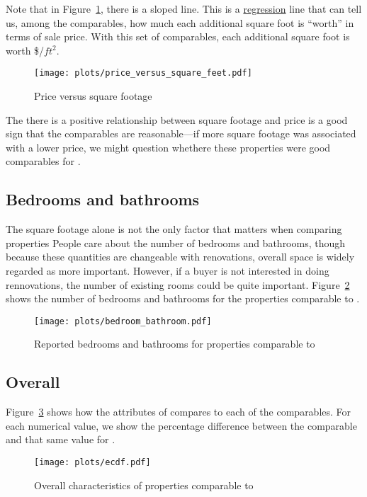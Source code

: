 \documentclass[
12pt, %
letterpaper, %
oneside, %
headinclude,footinclude, %
BCOR5mm, %
]{scrartcl}
\begin{document}
Note that in Figure~\ref{fig:price_versus_square_feet}, there is a sloped line.
This is a \href{https://en.wikipedia.org/wiki/Linear_regression}{regression} line that can tell us, among the comparables, how much each additional square foot is ``worth'' in terms of sale price.
With this set of comparables, each additional square foot is worth \$\MarginalPricePerFoot{}/$ft^2$. 

\begin{figure}
\centering
\caption{Price versus square footage} \label{fig:price_versus_square_feet}  
\texttt{[image: plots/price\_versus\_square\_feet.pdf]} 
\end{figure}

The there is a positive relationship between square footage and price is a good sign that the comparables are reasonable---if more square footage was associated with a lower price, we might question whethere these properties were good comparables for \PropertyName{}. 

\subsection{Bedrooms and bathrooms}
The square footage alone is not the only factor that matters when comparing properties
People care about the number of bedrooms and bathrooms, though because these quantities are changeable with renovations, overall space is widely regarded as more important.
However, if a buyer is not interested in doing rennovations, the number of existing rooms could be quite important.
Figure~\ref{fig:bedroom_bathroom} shows the number of bedrooms and bathrooms for the properties comparable to \PropertyName{}. 

\begin{figure}
\centering
\caption{Reported bedrooms and bathrooms for properties comparable to \PropertyName{}} \label{fig:bedroom_bathroom}  
\texttt{[image: plots/bedroom\_bathroom.pdf]} 
\end{figure}

\subsection{Overall}
Figure~\ref{fig:ecdf} shows how the attributes of \PropertyName{} compares to each of the comparables.
For each numerical value, we show the percentage difference between the comparable and that same value for \PropertyName{}. 

\begin{figure}
\centering
\caption{Overall characteristics of properties comparable to \PropertyName{}} \label{fig:ecdf}  
\texttt{[image: plots/ecdf.pdf]} 
\end{figure}
\end{document}
